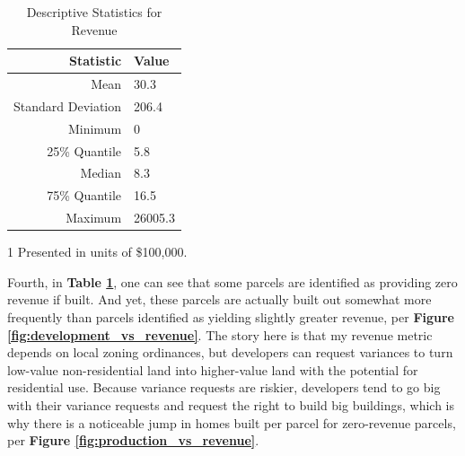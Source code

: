 \documentclass[a4paper,12pt]{article}
\begin{document}
\begin{table}
    \centering
    \caption{Descriptive Statistics for Revenue}
    \label{tab:describe.rev}
    \setlength{\tabcolsep}{10pt}
        \begin{threeparttable}
            \begin{tabular}{rl}
            \hline
            Statistic & Value\tnote{1} \\
            \hline
            Mean & 30.3\\
            Standard Deviation & 206.4 \\
            Minimum & 0 \\
            25\% Quantile & 5.8 \\
            Median & 8.3 \\
            75\% Quantile & 16.5 \\
            Maximum & 26005.3 \\
            \hline
            \end{tabular}
        \begin{tablenotes}
        \item[1]Presented in units of \$100,000.
        \end{tablenotes}
    \end{threeparttable}
\end{table}

Fourth, in \textbf{Table \ref{tab:describe.rev}}, one can see that some parcels are identified as providing zero revenue if built. And yet, these parcels are actually built out somewhat more frequently than parcels identified as yielding slightly greater revenue, per \textbf{Figure \ref{fig:development_vs_revenue}}. The story here is that my revenue metric depends on local zoning ordinances, but developers can request variances to turn low-value non-residential land into higher-value land with the potential for residential use. Because variance requests are riskier, developers tend to go big with their variance requests and request the right to build big buildings, which is why there is a noticeable jump in homes built per parcel for zero-revenue parcels, per \textbf{Figure \ref{fig:production_vs_revenue}}.
\end{document}
